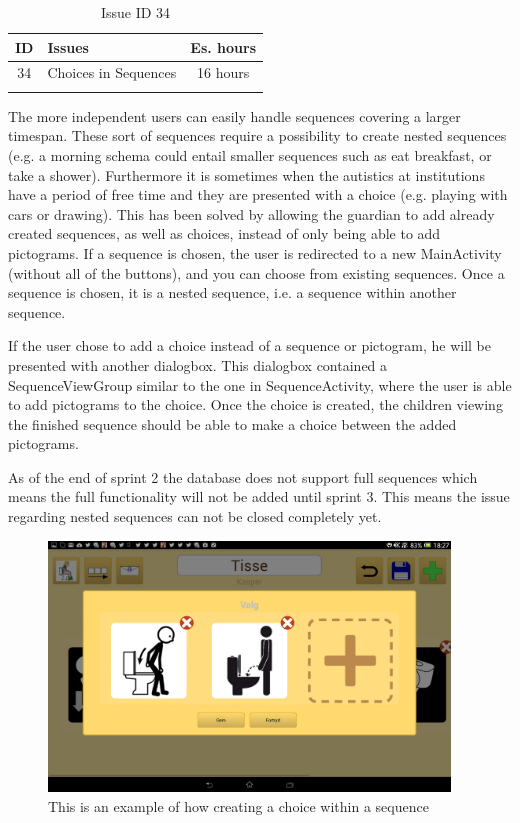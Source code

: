 \begin{longtable} { | c | p{12cm} | c | } 
\hline
	ID 	&	Issues	&		 Es. hours \\\hline
	34 	&	Choices in Sequences		&	16 hours \\\hline
\caption{Issue ID 34}
\label{tab:spr2_nested}
\end{longtable}

The more independent users can easily handle sequences covering a larger timespan. These sort of sequences require a possibility to create nested sequences (e.g. a morning schema could entail smaller sequences such as eat breakfast, or take a shower). Furthermore it is sometimes when the autistics at institutions have a period of free time and they are presented with a choice (e.g. playing with cars or drawing).
This has been solved by allowing the guardian to add already created sequences, as well as choices, instead of only being able to add pictograms. If a sequence is chosen, the user is redirected to a new MainActivity (without all of the buttons), and you can choose from existing sequences. Once a sequence is chosen, it is a nested sequence, i.e. a sequence within another sequence. 

If the user chose to add a choice instead of a sequence or pictogram, he will be presented with another dialogbox. This dialogbox contained a SequenceViewGroup similar to the one in SequenceActivity, where the user is able to add pictograms to the choice. Once the choice is created, the children viewing the finished sequence should be able to make a choice between the added pictograms.

As of the end of sprint 2 the database does not support full sequences which means the full functionality will not be added until sprint 3. This means the issue regarding nested sequences can not be closed completely yet.

\begin{figure} [h!]
\centering
\includegraphics[width=0.95\textwidth]{Pics/Sprint2/choices/choiceDialog.png}
\caption{This is an example of how creating a choice within a sequence}
\label{fig:choiceDialog}
\end{figure}




